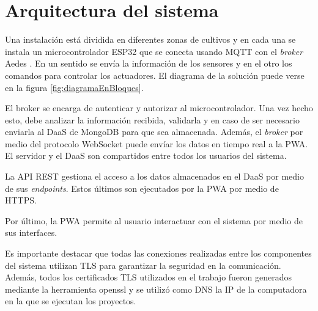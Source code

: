 \section{Arquitectura del sistema}

Una instalación está dividida en diferentes zonas de cultivos y en cada una se instala un microcontrolador ESP32 que se conecta usando MQTT con el \textit{broker} Aedes \citep{WEBSITE:AEDES}. En un sentido se envía la información de los sensores y en el otro los comandos para controlar los actuadores. El diagrama de la solución puede verse en la figura \ref{fig:diagramaEnBloques}.

El broker se encarga de autenticar y autorizar al microcontrolador. Una vez hecho esto, debe analizar la información recibida, validarla y en caso de ser necesario enviarla al DaaS de MongoDB para que sea almacenada. Además, el \textit{broker} por medio del protocolo WebSocket puede envíar los datos en tiempo real a la PWA. El servidor y el DaaS son compartidos entre todos los usuarios del sistema.

La API REST gestiona el acceso a los datos almacenados en el DaaS por medio de sus \textit{endpoints}. Estos últimos son ejecutados por la PWA por medio de HTTPS.

Por último, la PWA permite al usuario interactuar con el sistema por medio de sus interfaces.

Es importante destacar que todas las conexiones realizadas entre los componentes del sistema utilizan TLS para garantizar la seguridad en la comunicación. Además, todos los certificados TLS utilizados en el trabajo fueron generados mediante la herramienta openssl \citep{WEBSITE:OPENSSL} y se utilizó como DNS la IP de la computadora en la que se ejecutan los proyectos.

